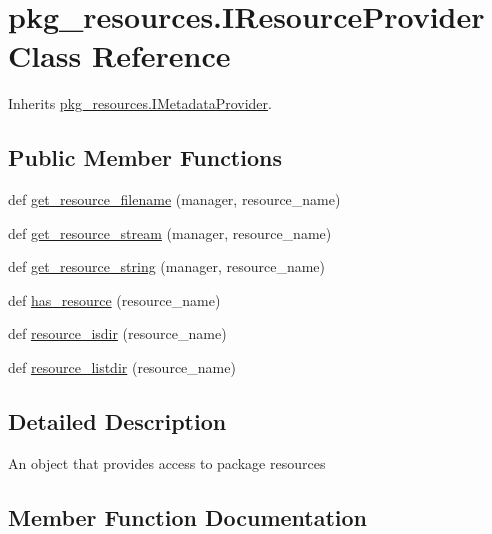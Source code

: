 \hypertarget{classpkg__resources_1_1_i_resource_provider}{}\section{pkg\+\_\+resources.\+I\+Resource\+Provider Class Reference}
\label{classpkg__resources_1_1_i_resource_provider}


Inherits \hyperlink{classpkg__resources_1_1_i_metadata_provider}{pkg\+\_\+resources.\+I\+Metadata\+Provider}.

\subsection*{Public Member Functions}
\begin{DoxyCompactItemize}
\item 
def \hyperlink{classpkg__resources_1_1_i_resource_provider_a1eaea3b763c5c7752fd697a636e7d7d8}{get\+\_\+resource\+\_\+filename} (manager, resource\+\_\+name)
\item 
def \hyperlink{classpkg__resources_1_1_i_resource_provider_ac027f5f8836dadb75f0d05c4d919fa1b}{get\+\_\+resource\+\_\+stream} (manager, resource\+\_\+name)
\item 
def \hyperlink{classpkg__resources_1_1_i_resource_provider_a2c860463185ea5a8c02d904afaa72a31}{get\+\_\+resource\+\_\+string} (manager, resource\+\_\+name)
\item 
def \hyperlink{classpkg__resources_1_1_i_resource_provider_a3be0ded1d6af19617ec116f70ea16320}{has\+\_\+resource} (resource\+\_\+name)
\item 
def \hyperlink{classpkg__resources_1_1_i_resource_provider_a02156b99af212145832c8b41b9448499}{resource\+\_\+isdir} (resource\+\_\+name)
\item 
def \hyperlink{classpkg__resources_1_1_i_resource_provider_a641c57dcce0cf87c1c58d64b4528d695}{resource\+\_\+listdir} (resource\+\_\+name)
\end{DoxyCompactItemize}


\subsection{Detailed Description}
\begin{DoxyVerb}An object that provides access to package resources\end{DoxyVerb}
 

\subsection{Member Function Documentation}
\mbox{\label{classpkg__resources_1_1_i_resource_provider_a1eaea3b763c5c7752fd697a636e7d7d8}} 
